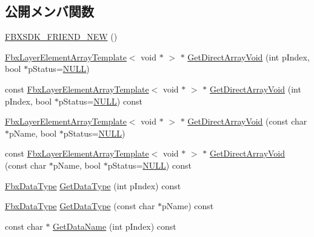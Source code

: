 \subsection*{公開メンバ関数}
\begin{DoxyCompactItemize}
\item 
\hyperlink{class_fbx_layer_element_user_data_a74d02ad7467ab2f2af089d3fad83f617}{F\+B\+X\+S\+D\+K\+\_\+\+F\+R\+I\+E\+N\+D\+\_\+\+N\+EW} ()
\item 
\hyperlink{class_fbx_layer_element_array_template}{Fbx\+Layer\+Element\+Array\+Template}$<$ void $\ast$ $>$ $\ast$ \hyperlink{class_fbx_layer_element_user_data_a8e1bfcb6d75d16a53275f69b1636d737}{Get\+Direct\+Array\+Void} (int p\+Index, bool $\ast$p\+Status=\hyperlink{fbxarch_8h_a070d2ce7b6bb7e5c05602aa8c308d0c4}{N\+U\+LL})
\item 
const \hyperlink{class_fbx_layer_element_array_template}{Fbx\+Layer\+Element\+Array\+Template}$<$ void $\ast$ $>$ $\ast$ \hyperlink{class_fbx_layer_element_user_data_a271bf5d91c8de1a35ffaef1404dd31db}{Get\+Direct\+Array\+Void} (int p\+Index, bool $\ast$p\+Status=\hyperlink{fbxarch_8h_a070d2ce7b6bb7e5c05602aa8c308d0c4}{N\+U\+LL}) const
\item 
\hyperlink{class_fbx_layer_element_array_template}{Fbx\+Layer\+Element\+Array\+Template}$<$ void $\ast$ $>$ $\ast$ \hyperlink{class_fbx_layer_element_user_data_aefbd9aaf1002ca95053801db3f6dec53}{Get\+Direct\+Array\+Void} (const char $\ast$p\+Name, bool $\ast$p\+Status=\hyperlink{fbxarch_8h_a070d2ce7b6bb7e5c05602aa8c308d0c4}{N\+U\+LL})
\item 
const \hyperlink{class_fbx_layer_element_array_template}{Fbx\+Layer\+Element\+Array\+Template}$<$ void $\ast$ $>$ $\ast$ \hyperlink{class_fbx_layer_element_user_data_a3dc62d940655a5afbf1e8893dba620a3}{Get\+Direct\+Array\+Void} (const char $\ast$p\+Name, bool $\ast$p\+Status=\hyperlink{fbxarch_8h_a070d2ce7b6bb7e5c05602aa8c308d0c4}{N\+U\+LL}) const
\item 
\hyperlink{class_fbx_data_type}{Fbx\+Data\+Type} \hyperlink{class_fbx_layer_element_user_data_ace571a6982892b8b200c660589d22847}{Get\+Data\+Type} (int p\+Index) const
\item 
\hyperlink{class_fbx_data_type}{Fbx\+Data\+Type} \hyperlink{class_fbx_layer_element_user_data_ac1d9a921886ec4840fa7472f7fd72b28}{Get\+Data\+Type} (const char $\ast$p\+Name) const
\item 
const char $\ast$ \hyperlink{class_fbx_layer_element_user_data_aba84f0175d90bd9e5b775391299e44fc}{Get\+Data\+Name} (int p\+Index) const

\end{DoxyCompactItemize}
